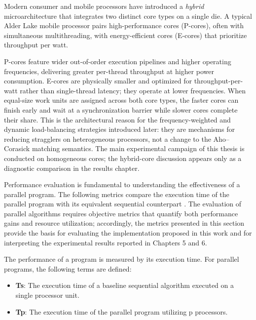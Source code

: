 Modern consumer and mobile processors have introduced a \textit{hybrid}
microarchitecture that integrates two distinct core types on a single die. A
typical Alder Lake mobile processor pairs high-performance cores (P-cores), often
with simultaneous multithreading, with energy-efficient cores (E-cores) that
prioritize throughput per watt.

P-cores feature wider out-of-order execution pipelines and higher operating
frequencies, delivering greater per-thread throughput at higher power
consumption. E-cores are physically smaller and optimized for
throughput-per-watt rather than single-thread latency; they operate at lower
frequencies. When equal-size work units are assigned across both core types, the
faster cores can finish early and wait at a synchronization barrier while slower
cores complete their share. This is the architectural reason for the
frequency-weighted and dynamic load-balancing strategies introduced later: they
are mechanisms for reducing stragglers on heterogeneous processors, not a change
to the Aho--Corasick matching semantics. The main experimental campaign of this
thesis is conducted on homogeneous cores; the hybrid-core discussion appears only
as a diagnostic comparison in the results chapter.


Performance evaluation is fundamental to understanding the effectiveness of a parallel program. The following metrics compare the execution time of the parallel program with its equivalent sequential counterpart \cite{Grama2003}.
The evaluation of parallel algorithms requires objective metrics that quantify both performance gains and resource utilization; accordingly, the metrics presented in this section provide the basis for evaluating the implementation proposed in this work and for interpreting the experimental results reported in Chapters 5 and 6.


The performance of a program is measured by its execution time. For parallel programs, the following terms are defined:
\begin{itemize}
    \item \textbf{Ts}: The execution time of a baseline sequential algorithm executed on a single processor unit.
    \item \textbf{Tp}: The execution time of the parallel program utilizing p processors.
\end{itemize}

